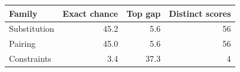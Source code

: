 \begin{tabular}{@{}l r r r@{}}
\toprule
Family & Exact chance & Top gap & Distinct scores \\
\midrule
Substitution & 45.2 & 5.6 & 56 \\
Pairing & 45.0 & 5.6 & 56 \\
Constraints & 3.4 & 37.3 & 4 \\
\bottomrule
\end{tabular}
